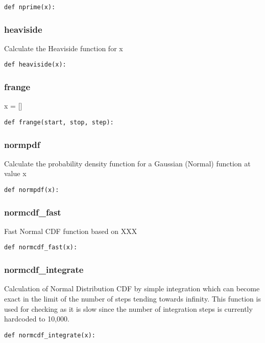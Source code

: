 \documentclass[twoside,11pt]{book}
\begin{document}
\begin{lstlisting}
def nprime(x):
\end{lstlisting}

\subsubsection*{{\bf heaviside}}
Calculate the Heaviside function for x  

\begin{lstlisting}
def heaviside(x):
\end{lstlisting}

\subsubsection*{{\bf frange}}
x = [] 

\begin{lstlisting}
def frange(start, stop, step):
\end{lstlisting}

\subsubsection*{{\bf normpdf}}
Calculate the probability density function for a Gaussian (Normal) function at value x 

\begin{lstlisting}
def normpdf(x):
\end{lstlisting}

\subsubsection*{{\bf normcdf\_fast}}
Fast Normal CDF function based on XXX  

\begin{lstlisting}
def normcdf_fast(x):
\end{lstlisting}

\subsubsection*{{\bf normcdf\_integrate}}
Calculation of Normal Distribution CDF by simple integration which can become exact in the limit of the number of steps tending towards infinity. This function is used for checking as it is slow since the number of integration steps is currently hardcoded to 10,000. 

\begin{lstlisting}
def normcdf_integrate(x):
\end{lstlisting}
\end{document}
